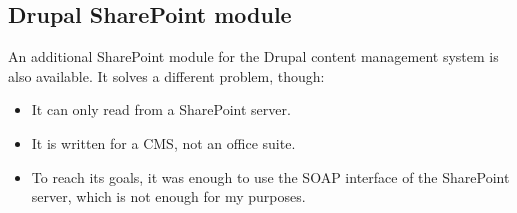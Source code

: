 \subsection*{Drupal SharePoint module}

An additional SharePoint module\cite{drupal-sp} for the Drupal content management system is also available. It solves a different problem, though:

\begin{itemize}
\item It can only read from a SharePoint server.
\item It is written for a CMS, not an office suite.
\item To reach its goals, it was enough to use the SOAP interface of the
SharePoint server, which is not enough for my purposes.
\end{itemize}
